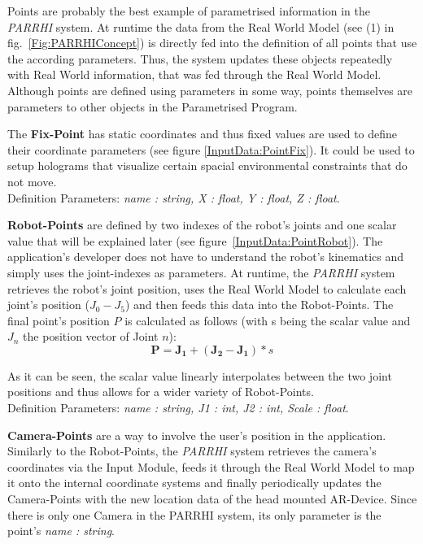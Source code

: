 Points are probably the best example of parametrised information in the \textit{PARRHI} system. At runtime the data from the Real World Model (see (1) in fig.~\ref{Fig:PARRHIConcept}) is directly fed into the definition of all points that use the according parameters. Thus, the system updates these objects repeatedly with Real World information, that was fed through the Real World Model. Although points are defined using parameters in some way, points themselves are parameters to other objects in the Parametrised Program.

The \textbf{Fix-Point} has static coordinates and thus fixed values are used to define their coordinate parameters (see figure \ref{InputData:PointFix}). It could be used to setup holograms that visualize certain spacial environmental constraints that do not move.\\Definition Parameters: \textit{name : string, X : float, Y : float, Z : float}.

\textbf{Robot-Points} are defined by two indexes of the robot's joints and one scalar value that will be explained later (see figure~\ref{InputData:PointRobot}). The application's developer does not have to understand the robot's kinematics and simply uses the joint-indexes as parameters. At runtime, the \textit{PARRHI} system retrieves the robot's joint position, uses the Real World Model to calculate each joint's position ($J_0 - J_5$) and then feeds this data into the Robot-Points. The final point's position $P$ is calculated as follows (with s being the scalar value and $J_n$ the position vector of Joint $n$):
\begin{equation}
\boldsymbol{P} = \boldsymbol{J_1} + (\boldsymbol{J_2}-\boldsymbol{J_1}) * s
\end{equation}

As it can be seen, the scalar value linearly interpolates between the two joint positions and thus allows for a wider variety of Robot-Points.\\Definition Parameters: \textit{name : string, J1 : int, J2 : int, Scale : float}.

\textbf{Camera-Points} are a way to involve the user's position in the application. Similarly to the Robot-Points, the \textit{PARRHI} system retrieves the camera's coordinates via the Input Module, feeds it through the Real World Model to map it onto the internal coordinate systems and finally periodically updates the Camera-Points with the new location data of the head mounted AR-Device. Since there is only one Camera in the PARRHI system, its only parameter is the point's \textit{name : string}.


